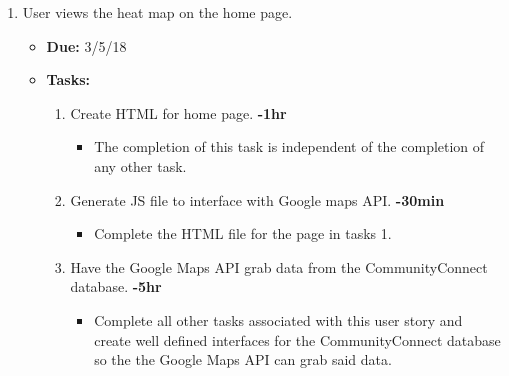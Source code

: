 \documentclass[12pt]{article}
\begin{document}
\begin{enumerate}
    \item User views the heat map on the home page.
      \begin{itemize}
        \item \textbf{Due:} 3/5/18
        \item \textbf{Tasks:}
          \begin{enumerate}
            \item Create HTML for home page. \textbf{-1hr}
              \begin{itemize}
                \item The completion of this task is independent of the completion of any other task.
              \end{itemize}
            \item Generate JS file to interface with Google maps API. \textbf{-30min}
              \begin{itemize}
                \item Complete the HTML file for the page in tasks 1.
              \end{itemize}
            \item Have the Google Maps API grab data from the CommunityConnect database. \textbf{-5hr}
              \begin{itemize}
                \item Complete all other tasks associated with this user story and create well defined interfaces for the CommunityConnect database so the the Google Maps API can grab said data.
              \end{itemize}
          \end{enumerate}
      \end{itemize}


\end{enumerate}
\end{document}
